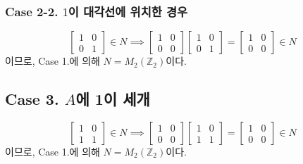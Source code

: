 \documentclass{article}
\begin{document}
\subsubsection{Case 2-2. $1$이 대각선에 위치한 경우}
$$
\begin{bmatrix}
1&0  \\ 
0&1
\end{bmatrix} \in N \implies
\begin{bmatrix}
1&0  \\ 
0&0
\end{bmatrix} 
\begin{bmatrix}
1&0  \\ 
0&1
\end{bmatrix} =
\begin{bmatrix}
1&0  \\ 
0&0
\end{bmatrix} \in N
$$이므로, Case 1.에 의해 $N = M_2 ( \mathbb{Z}_2)$이다.

\subsection{Case 3. $A$에 1이 세개}
$$
\begin{bmatrix}
1&0  \\ 
1&1
\end{bmatrix} \in N \implies
\begin{bmatrix}
1&0  \\ 
0&0
\end{bmatrix} 
\begin{bmatrix}
1&0  \\ 
1&1
\end{bmatrix} =
\begin{bmatrix}
1&0  \\ 
0&0
\end{bmatrix} \in N
$$이므로, Case 1.에 의해 $N = M_2 ( \mathbb{Z}_2)$이다.
\end{document}
